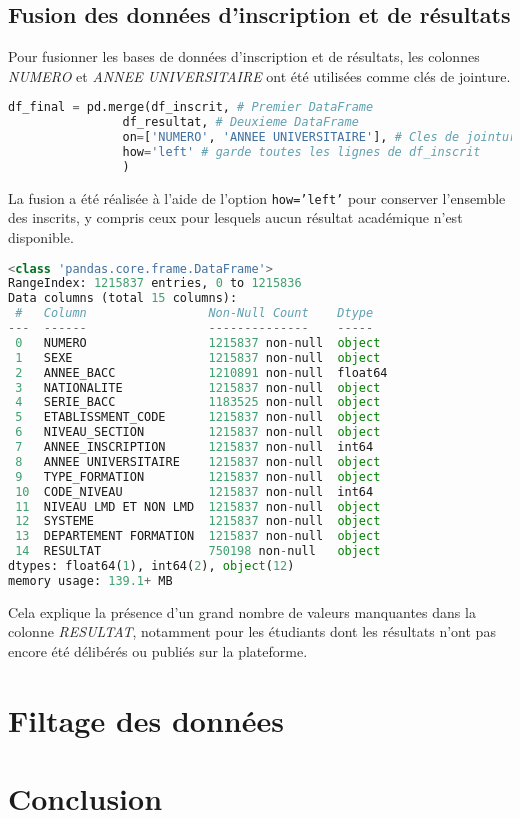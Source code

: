 \newpage
\subsection{Fusion des données d’inscription et de résultats}

Pour fusionner les bases de données d’inscription et de résultats, 
les colonnes \textit{NUMERO} et \textit{ANNEE UNIVERSITAIRE} ont été utilisées comme clés de jointure. 

\begin{lstlisting}[language=Python,
    caption=Jointure des données d’inscription et de résultats,
    label=lst:jointure_ucad,
    basicstyle=\ttfamily\small,
    backgroundcolor=\color{gray!10}
]
df_final = pd.merge(df_inscrit, # Premier DataFrame
                df_resultat, # Deuxieme DataFrame
                on=['NUMERO', 'ANNEE UNIVERSITAIRE'], # Cles de jointure
                how='left' # garde toutes les lignes de df_inscrit
                ) 
\end{lstlisting}

La fusion a été réalisée à l’aide de l’option \texttt{how='left'} pour conserver l’ensemble des inscrits, 
y compris ceux pour lesquels aucun résultat académique n’est disponible.

\begin{lstlisting}[language=Python,
    caption=Info global du data des inscriptions et résultats, 
    label=lst:inscription_resultat_ucad, 
    basicstyle=\ttfamily\footnotesize, 
    backgroundcolor=\color{gray!10}
]
<class 'pandas.core.frame.DataFrame'>
RangeIndex: 1215837 entries, 0 to 1215836
Data columns (total 15 columns):
 #   Column                 Non-Null Count    Dtype  
---  ------                 --------------    -----  
 0   NUMERO                 1215837 non-null  object 
 1   SEXE                   1215837 non-null  object 
 2   ANNEE_BACC             1210891 non-null  float64
 3   NATIONALITE            1215837 non-null  object 
 4   SERIE_BACC             1183525 non-null  object 
 5   ETABLISSMENT_CODE      1215837 non-null  object 
 6   NIVEAU_SECTION         1215837 non-null  object 
 7   ANNEE_INSCRIPTION      1215837 non-null  int64  
 8   ANNEE UNIVERSITAIRE    1215837 non-null  object 
 9   TYPE_FORMATION         1215837 non-null  object 
 10  CODE_NIVEAU            1215837 non-null  int64  
 11  NIVEAU LMD ET NON LMD  1215837 non-null  object 
 12  SYSTEME                1215837 non-null  object 
 13  DEPARTEMENT FORMATION  1215837 non-null  object 
 14  RESULTAT               750198 non-null   object 
dtypes: float64(1), int64(2), object(12)
memory usage: 139.1+ MB
\end{lstlisting}

Cela explique la présence d’un grand nombre de valeurs manquantes dans la colonne \textit{RESULTAT}, 
notamment pour les étudiants dont les résultats n'ont pas encore été délibérés ou publiés sur la plateforme.

\newpage

\section{Filtage des données}
\section{Conclusion}